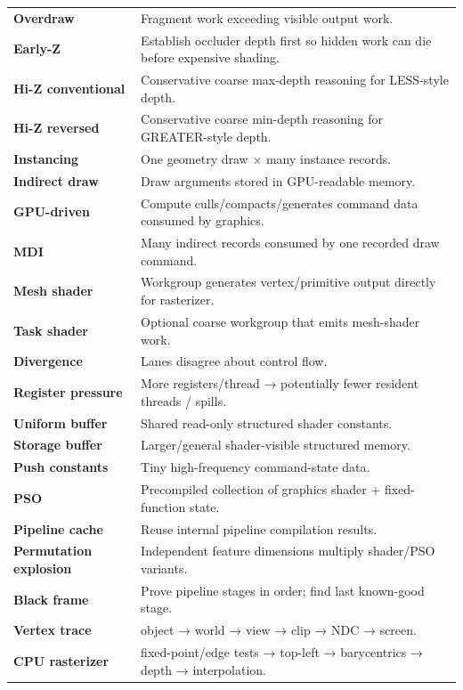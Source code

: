 {\begin{longtable}[]{@{}
  >{\raggedright\arraybackslash}p{}
  >{\raggedright\arraybackslash}p{}@{}}
\textbf{Overdraw} & Fragment work exceeding visible output work. \\
\textbf{Early-Z} & Establish occluder depth first so hidden work can die before expensive shading. \\
\textbf{Hi-Z conventional} & Conservative coarse max-depth reasoning for LESS-style depth. \\
\textbf{Hi-Z reversed} & Conservative coarse min-depth reasoning for GREATER-style depth. \\
\textbf{Instancing} & One geometry draw × many instance records. \\
\textbf{Indirect draw} & Draw arguments stored in GPU-readable memory. \\
\textbf{GPU-driven} & Compute culls/compacts/generates command data consumed by graphics. \\
\textbf{MDI} & Many indirect records consumed by one recorded draw command. \\
\textbf{Mesh shader} & Workgroup generates vertex/primitive output directly for rasterizer. \\
\textbf{Task shader} & Optional coarse workgroup that emits mesh-shader work. \\
\textbf{Divergence} & Lanes disagree about control flow. \\
\textbf{Register pressure} & More registers/thread → potentially fewer resident threads / spills. \\
\textbf{Uniform buffer} & Shared read-only structured shader constants. \\
\textbf{Storage buffer} & Larger/general shader-visible structured memory. \\
\textbf{Push constants} & Tiny high-frequency command-state data. \\
\textbf{PSO} & Precompiled collection of graphics shader + fixed-function state. \\
\textbf{Pipeline cache} & Reuse internal pipeline compilation results. \\
\textbf{Permutation explosion} & Independent feature dimensions multiply shader/PSO variants. \\
\textbf{Black frame} & Prove pipeline stages in order; find last known-good stage. \\
\textbf{Vertex trace} & object → world → view → clip → NDC → screen. \\
\textbf{CPU rasterizer} & fixed-point/edge tests → top-left → barycentrics → depth → interpolation. \\
\end{longtable}
}

